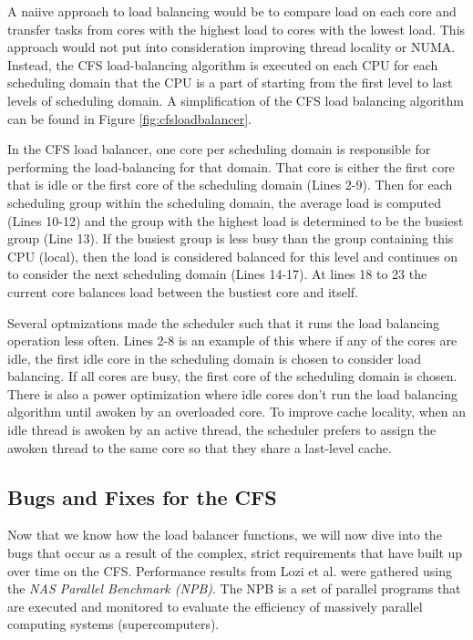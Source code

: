 \documentclass{sig-alternate}
\begin{document}
A naiive approach to load balancing would be to compare load on each core and transfer tasks from cores with the highest load to cores with the lowest load. This approach would not put into consideration improving thread locality or NUMA. Instead, the CFS load-balancing algorithm is executed on each CPU for each scheduling domain that the CPU is a part of starting from the first level to last levels of scheduling domain. A simplification of the CFS load balancing algorithm can be found in Figure \ref{fig:cfsloadbalancer}.

In the CFS load balancer, one core per scheduling domain is responsible for performing the load-balancing for that domain. That core is either the first core that is idle or the first core of the scheduling domain (Lines 2-9). Then for each scheduling group within the scheduling domain, the average load is computed (Lines 10-12) and the group with the highest load is determined to be the busiest group (Line 13). If the busiest group is less busy than the group containing this CPU (local), then the load is considered balanced for this level and continues on to consider the next scheduling domain (Lines 14-17). At lines 18 to 23 the current core balances load between the bustiest core and itself.~\cite{Lozi:2016}

Several optmizations made the scheduler such that it runs the load balancing operation less often. Lines 2-8 is an example of this where if any of the cores are idle, the first idle core in the scheduling domain is chosen to consider load balancing. If all cores are busy, the first core of the scheduling domain is chosen. There is also a power optimization where idle cores don't run the load balancing algorithm until awoken by an overloaded core. To improve cache locality, when an idle thread is awoken by an active thread, the scheduler prefers to assign the awoken thread to the same core so that they share a last-level cache.~\cite{Lozi:2016}

\subsection{Bugs and Fixes for the CFS}
\label{sec:cfsbugs}

Now that we know how the load balancer functions, we will now dive into the bugs that occur as a result of the complex, strict requirements that have built up over time on the CFS. Performance results from Lozi et al. were gathered using the \emph{NAS Parallel Benchmark (NPB)}. The NPB is a set of parallel programs that are executed and monitored to evaluate the efficiency of massively parallel computing systems (supercomputers).
\end{document}
